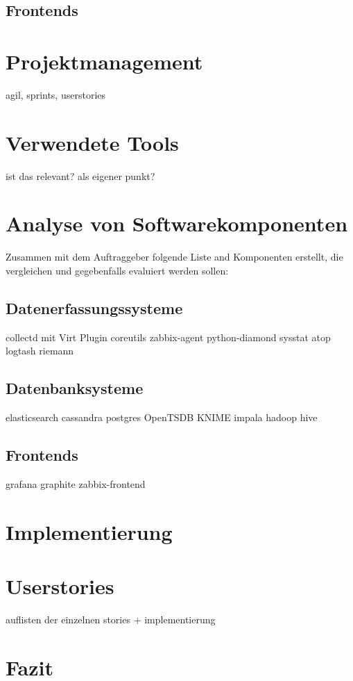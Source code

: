 \subsection{Frontends}

\section{Projektmanagement}
agil, sprints, userstories

\section{Verwendete Tools}
ist das relevant? als eigener punkt?

\section{Analyse von Softwarekomponenten}
Zusammen mit dem Auftraggeber folgende Liste and Komponenten erstellt, die
vergleichen und gegebenfalls evaluiert werden sollen:

\subsection{Datenerfassungssysteme}

\begin{outline}
  \1 collectd mit Virt Plugin
  \1 coreutils
  \1 zabbix-agent
  \1 python-diamond
  \1 sysstat
  \1 atop
  \1 logtash
  \1 riemann
\end{outline}

\subsection{Datenbanksysteme}

\begin{outline}
  \1 elasticsearch
  \1 cassandra
  \1 postgres
  \1 OpenTSDB
  \1 KNIME
  \1 impala
  \1 hadoop
  \1 hive
\end{outline}

\subsection{Frontends}

\begin{outline}
  \1 grafana
  \1 graphite
  \1 zabbix-frontend
\end{outline}

\section{Implementierung}

\section{Userstories}
auflisten der einzelnen stories + implementierung

\section{Fazit}

\printbibliography
